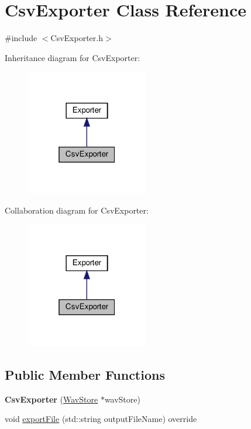 \hypertarget{classCsvExporter}{}\section{Csv\+Exporter Class Reference}
\label{classCsvExporter}


{\ttfamily \#include $<$Csv\+Exporter.\+h$>$}



Inheritance diagram for Csv\+Exporter\+:
\nopagebreak
\begin{figure}[H]
\begin{center}
\leavevmode
\includegraphics[width=151pt]{d9/de1/classCsvExporter__inherit__graph}
\end{center}
\end{figure}


Collaboration diagram for Csv\+Exporter\+:
\nopagebreak
\begin{figure}[H]
\begin{center}
\leavevmode
\includegraphics[width=151pt]{d1/d8d/classCsvExporter__coll__graph}
\end{center}
\end{figure}
\subsection*{Public Member Functions}
\begin{DoxyCompactItemize}
\item 
\mbox{\label{classCsvExporter_afcfc9bae89b6f769d0870e9fc85d3310}} 
{\bfseries Csv\+Exporter} (\hyperlink{classWavStore}{Wav\+Store} $\ast$wav\+Store)
\item 
void \hyperlink{classCsvExporter_ac358fc74b1c01dbb3285fcdb38eb899e}{export\+File} (std\+::string output\+File\+Name) override
\end{DoxyCompactItemize}


